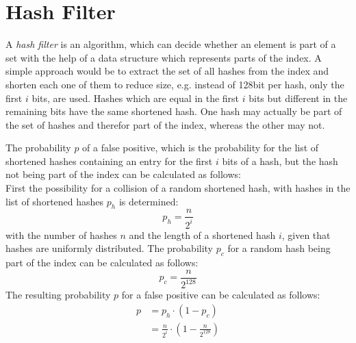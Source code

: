 \section{Hash Filter}\label{section:implementation/hash_filter}
A \textit{hash filter} is an algorithm, which can decide whether an element is part of a set with the help of a data structure which represents parts of the index.
A simple approach would be to extract the set of all hashes from the index and shorten each one of them to reduce size, e.g. instead of 128bit per hash, only the first $i$ bits, are used.
Hashes which are equal in the first $i$ bits but different in the remaining bits have the same shortened hash.
One hash may actually be part of the set of hashes and therefor part of the index, whereas the other may not.

The probability $p$ of a false positive, which is the probability for the list of shortened hashes containing an entry for the first $i$ bits of a hash, but the hash not being part of the index can be calculated as follows:\\
First the possibility for a collision of a random shortened hash, with hashes in the list of shortened hashes $p_h$ is determined:
\begin{equation}
	p_h=\frac{n}{2^i}
\end{equation}
with the number of hashes $n$ and the length of a shortened hash $i$, given that hashes are uniformly distributed.
The probability $p_c$ for a random hash being part of the index can be calculated as follows:
\begin{equation}
	p_c=\frac{n}{2^{128}}
\end{equation}
The resulting probability $p$ for a false positive can be calculated as follows:
\begin{equation}
	\begin{split}
		p&=p_h\cdot (1-p_c) \\[10pt]
		&= \frac{n}{2^i}\cdot \left(1-\frac{n}{2^{128}}\right)
	\end{split}
\end{equation}

